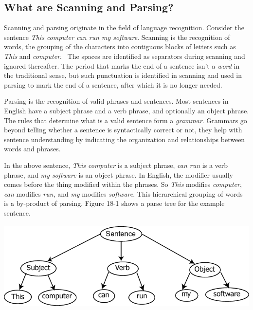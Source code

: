 \subsection{What are Scanning and Parsing?}

Scanning and parsing originate in the field of language recognition.
Consider the sentence \textit{This computer can run my software}.
Scanning is the recognition of words, the grouping of the characters
into contiguous blocks of letters such as \textit{This} and
\textit{computer}. \ The spaces are identified as separators
during scanning and ignored thereafter. The period that marks the end
of a sentence isn't a {\em word\/} in the traditional sense, but
such punctuation is identified in scanning and used in parsing to
mark the end of a sentence, after which it is no longer needed.

Parsing is the recognition of valid phrases and sentences. Most
sentences in English have a subject phrase and a verb phrase, and
optionally an object phrase. The rules that determine what is a valid
sentence form a {\em grammar\/}. Grammars go beyond telling whether
a sentence is syntactically correct or not, they help with sentence
understanding by indicating the organization and relationships between
words and phrases.

In the above sentence, \textit{This computer} is a
subject phrase, \textit{can run} is a verb phrase, and \textit{my
software} is an object phrase. In English, the modifier usually
comes before the 
thing modified within the phrases. So \textit{This} modifies
\textit{computer}, \textit{can} modifies \textit{run}, and \textit{my}
modifies \textit{software}. This hierarchical grouping of words is a
by-product of parsing. Figure 18-1 shows a parse tree for
the example sentence.


\bigskip

\begin{center}
\includegraphics[width=5.4362in,height=1.7846in]{ub-img/ub-img64.png}
\end{center}

